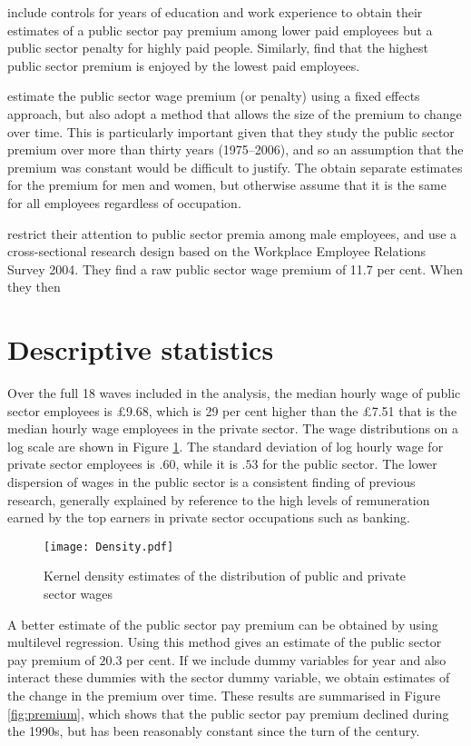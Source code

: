 \documentclass[a4paper,11pt,titlepage]{article}
\begin{document}
\citet{Yu2005} include controls for years of education and work experience to obtain their estimates of a public sector pay premium among lower paid employees but a public sector penalty for highly paid people.  Similarly, \citet{Luciflora2006} find that the highest public sector premium is enjoyed by the lowest paid employees.

\citet{Disney2008} estimate the public sector wage premium (or penalty) using a fixed effects approach, but also adopt a method that allows the size of the premium to change over time.  This is particularly important given that they study the public sector premium over more than thirty years (1975--2006), and so an assumption that the premium was constant would be difficult to justify.  The obtain separate estimates for the premium for men and women, but otherwise assume that it is the same for all employees regardless of occupation.

\citet{Chatterji2007} restrict their attention to public sector premia among male employees, and use a cross-sectional research design based on the Workplace Employee Relations Survey 2004.  They find a raw public sector wage premium of 11.7 per cent.  When they then

\section{Descriptive statistics}
Over the full 18 waves included in the analysis, the median hourly wage of public sector employees is \pounds 9.68, which is 29 per cent higher than the \pounds 7.51 that is the median hourly wage employees in the private sector.  The wage distributions on a log scale are shown in Figure \ref{fig:density}.  The standard deviation of log hourly wage for private sector employees is $.60$, while it is $.53$ for the public sector.  The lower dispersion of wages in the public sector is a consistent finding of previous research, generally explained by reference to the high levels of remuneration earned by the top earners in private sector occupations such as banking.

\begin{figure}[tb]
    \centering
    \texttt{[image: Density.pdf]}
    \caption{Kernel density estimates of the distribution of public and private sector wages\label{fig:density}}
\end{figure}

A better estimate of the public sector pay premium can be obtained by using multilevel regression.  Using this method gives an estimate of the public sector pay premium of $20.3$ per cent.  If we include dummy variables for year and also interact these dummies with the sector dummy variable, we obtain estimates of the change in the premium over time.  These results are summarised in Figure \ref{fig:premium}, which shows that the public sector pay premium declined during the 1990s, but has been reasonably constant since the turn of the century.
\end{document}
